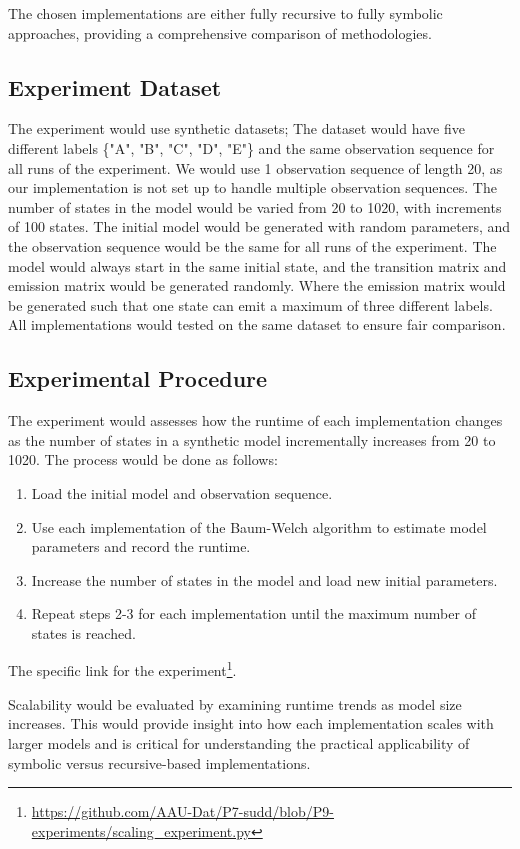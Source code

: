 The chosen implementations are either fully recursive to fully symbolic approaches, providing a comprehensive comparison of methodologies.

\subsection{Experiment Dataset}
The experiment would use synthetic datasets; The dataset would have five different labels \{"A", "B", "C", "D", "E"\} and the same observation sequence for all runs of the experiment. 
We would use 1 observation sequence of length 20, as our implementation is not set up to handle multiple observation sequences.
The number of states in the model would be varied from 20 to 1020, with increments of 100 states.
The initial model would be generated with random parameters, and the observation sequence would be the same for all runs of the experiment.
The model would always start in the same initial state, and the transition matrix and emission matrix would be generated randomly.
Where the emission matrix would be generated such that one state can emit a maximum of three different labels.
All implementations would tested on the same dataset to ensure fair comparison.

\subsection{Experimental Procedure}
The experiment would assesses how the runtime of each implementation changes as the number of states in a synthetic model incrementally increases from 20 to 1020. 
The process would be done as follows:

\begin{enumerate}
\item Load the initial model and observation sequence.
\item Use each implementation of the Baum-Welch algorithm to estimate model parameters and record the runtime.
\item Increase the number of states in the model and load new initial parameters.
\item Repeat steps 2-3 for each implementation until the maximum number of states is reached.
\end{enumerate}

The specific link for the experiment\footnote{\url{https://github.com/AAU-Dat/P7-sudd/blob/P9-experiments/scaling_experiment.py}}. 

Scalability would be evaluated by examining runtime trends as model size increases.
This would provide insight into how each implementation scales with larger models and is critical for understanding the practical applicability of symbolic versus recursive-based implementations.

